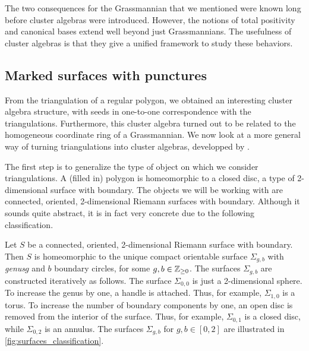 The two consequences for the Grassmannian that we mentioned were known long before
cluster algebras were introduced. However, the notions of total positivity and
canonical bases extend well beyond just Grassmannians. The usefulness of cluster
algebras is that they give a unified framework to study these behaviors.

\subsection{Marked surfaces with punctures}\label{sec:triangulations_of_surfaces}

From the triangulation of a regular polygon, we obtained an interesting cluster algebra
structure, with seeds in one-to-one correspondence with the triangulations.
Furthermore, this cluster algebra turned out to be related to the homogeneous
coordinate ring of a Grassmannian. We now look at a more general way of turning
triangulations into cluster algebras, developped by
\textcite[postnote]{FominShapiroThurston2008CATriangulatedSurfacesI}.

\medskip
The first step is to generalize the type of object on which we consider triangulations. A (filled in) polygon is homeomorphic to a closed disc, a type of 2-dimensional surface with boundary. The objects we will be working with are connected, oriented, 2-dimensional Riemann surfaces with boundary. Although it sounds quite abstract, it is in fact very concrete due to the following classification.
\begin{theorem}\label{thm:classification_surfaces}

	Let $S$ be a connected, oriented, 2-dimensional Riemann surface with boundary. Then $S$
	is homeomorphic to the unique compact orientable surface $\Sigma_{g,b}$ with \emph{genus}$g$ and $b$ boundary circles,
	for some $g, b \in \mathbb{Z}_{\geq 0}$. The surfaces $\Sigma_{g,b}$ are constructed
	iteratively as follows. The surface $\Sigma_{0,0}$ is just a 2-dimensional sphere. To
	increase the genus by one, a handle is attached. Thus, for example, $\Sigma_{1,0}$ is a
	torus. To increase the number of boundary components by one, an open disc is removed
	from the interior of the surface. Thus, for example, $\Sigma_{0,1}$ is a closed disc,
	while $\Sigma_{0,2}$ is an annulus. The surfaces $\Sigma_{g,b}$ for $g,b \in [0,2]$ are
	illustrated in \cref{fig:surfaces_classification}.
\end{theorem}

